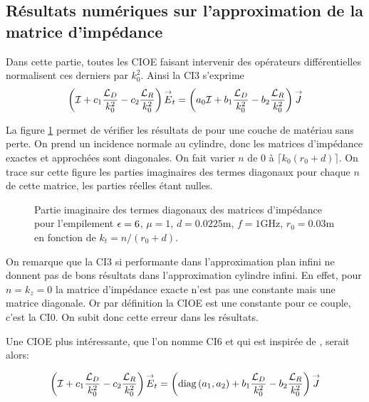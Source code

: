   \subsection{Résultats numériques sur l'approximation de la matrice d'impédance}

    Dans cette partie, toutes les CIOE faisant intervenir des opérateurs différentielles normalisent ces derniers par \(k_0^2\). Ainsi la CI3 s'exprime
    \begin{equation*}
      \left({\mathcal{I}} + c_1\dfrac{{\mathcal{L}_D}}{k_0^2} -c_2\dfrac{{\mathcal{L}_R}}{k_0^2}\right){\overset{\rightarrow}{E}}_t = \left(a_0{\mathcal{I}} + b_1\dfrac{{\mathcal{L}_D}}{k_0^2} - b_2 \dfrac{{\mathcal{L}_R}}{k_0^2} \right){\overset{\rightarrow}{J}}
    \end{equation*}

    La figure \ref{fig:imp_fourier:plan:hoppe:62:hoibc:ibc6} permet de vérifier les résultats de \cite[p.~62]{hoppe_impedance_1995} pour une couche de matériau sans perte. On prend un incidence normale au cylindre, donc les matrices d'impédance exactes et approchées sont diagonales. On fait varier \(n\) de 0 à \(\lceil k_0 (r_0+d) \rceil\). On trace sur cette figure les parties imaginaires des termes diagonaux pour chaque \(n\) de cette matrice, les parties réelles étant nulles.

    \begin{figure}[!hbt]
      \centering
      
      \caption[CIOE sur empilement de Hoppe & Rahmat-Samii p.~62]{Partie imaginaire des termes diagonaux des matrices d'impédance pour l'empilement \(\epsilon = 6\), \(\mu = 1\), \(d=0.0225\text{m}\), \(f=1\text{GHz}\), \(r_0=0.03\text{m}\) en fonction de \(k_t = n / (r_0+d)\).}
      \label{fig:imp_fourier:plan:hoppe:62:hoibc:ibc6}
    \end{figure}
    
    On remarque que la CI3 si performante dans l'approximation plan infini ne donnent pas de bons résultats dans l’approximation cylindre infini. 
    En effet, pour \(n=k_z=0\) la matrice d'impédance exacte n'est pas une constante mais une matrice diagonale. 
    Or par définition la CIOE est une constante pour ce couple, c'est la CI0. On subit donc cette erreur dans les résultats. 

    Une CIOE plus intéressante, que l'on nomme CI6 et qui est inspirée de \cite[p.~60]{hoppe_impedance_1995}, serait alors:

    \begin{equation*}
      \left({\mathcal{I}} + c_1\dfrac{{\mathcal{L}_D}}{k_0^2} -c_2\dfrac{{\mathcal{L}_R}}{k_0^2}\right){\overset{\rightarrow}{E}}_t = \left(\operatorname{diag}\left(a_1,a_2\right) + b_1\dfrac{{\mathcal{L}_D}}{k_0^2} - b_2 \dfrac{{\mathcal{L}_R}}{k_0^2} \right){\overset{\rightarrow}{J}}
    \end{equation*}

